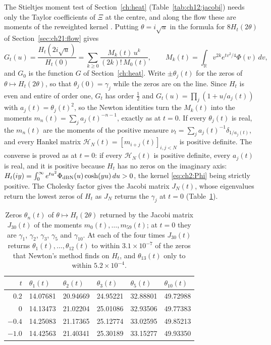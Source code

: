 The Stieltjes moment test of Section~\ref{ch:heat} (Table~\ref{tab:ch12:jacobi}) needs only the Taylor coefficients of $\Xi$ at the centre, and along the flow these are moments of the reweighted kernel \cite{P26wig}. Putting $\theta=i\sqrt u$ in the formula for $8H_t(2\theta)$ of Section~\ref{sec:ch21:flow} gives
\[
G_t(u)=\frac{H_t(2i\sqrt u)}{H_t(0)}=\sum_{k\ge0}\frac{M_k(t)\,u^k}{(2k)!\,M_0(t)},\qquad M_k(t)=\int_{\mathbb R}v^{2k}e^{tv^2/4}\Phi(v)\,dv,
\]
and $G_0$ is the function $G$ of Section~\ref{ch:heat}. Write $\pm\theta_j(t)$ for the zeros of $\theta\mapsto H_t(2\theta)$, so that $\theta_j(0)=\gamma_j$ while the zeros are on the line. Since $H_t$ is even and entire of order one, $G_t$ has order $\frac12$ and $G_t(u)=\prod_j(1+u/a_j(t))$ with $a_j(t)=\theta_j(t)^2$, so the Newton identities turn the $M_k(t)$ into the moments $m_n(t)=\sum_ja_j(t)^{-n-1}$, exactly as at $t=0$. If every $\theta_j(t)$ is real, the $m_n(t)$ are the moments of the positive measure $\nu_t=\sum_ja_j(t)^{-1}\delta_{1/a_j(t)}$, and every Hankel matrix $\mathcal H_N(t)=[m_{i+j}(t)]_{i,j<N}$ is positive definite. The converse is proved as at $t=0$: if every $\mathcal H_N(t)$ is positive definite, every $a_j(t)$ is real, and it is positive because $H_t$ has no zeros on the imaginary axis: $H_t(iy)=\int_0^\infty e^{tu^2}\Phi_{\rm dBN}(u)\cosh(yu)\,du>0$, the kernel \eqref{eq:ch2:Phi} being strictly positive. The Cholesky factor gives the Jacobi matrix $J_N(t)$, whose eigenvalues return the lowest zeros of $H_t$ as $J_N$ returns the $\gamma_j$ at $t=0$ (Table~\ref{tab:ch21:flowzeros}).

\begin{table}[htbp]
\centering\small
\begin{tabular}{rlllll}
\toprule
$t$ & $\theta_1(t)$ & $\theta_2(t)$ & $\theta_3(t)$ & $\theta_5(t)$ & $\theta_{10}(t)$\\
\midrule
$0.2$ & 14.07681 & 20.94669 & 24.95221 & 32.88801 & 49.72988\\
$0$ & 14.13473 & 21.02204 & 25.01086 & 32.93506 & 49.77383\\
$-0.4$ & 14.25083 & 21.17365 & 25.12774 & 33.02595 & 49.85213\\
$-1.0$ & 14.42563 & 21.40341 & 25.30189 & 33.15277 & 49.93350\\
\bottomrule
\end{tabular}
\caption{Zeros $\theta_n(t)$ of $\theta\mapsto H_t(2\theta)$ returned by the Jacobi matrix $J_{30}(t)$ of the moments $m_0(t),\dots,m_{59}(t)$; at $t=0$ they are $\gamma_1$, $\gamma_2$, $\gamma_3$, $\gamma_5$ and $\gamma_{10}$. At each of the four times $J_{30}(t)$ returns $\theta_1(t),\dots,\theta_{12}(t)$ to within $3.1\times10^{-7}$ of the zeros that Newton's method finds on $H_t$, and $\theta_{13}(t)$ only to within $5.2\times10^{-4}$.}
\label{tab:ch21:flowzeros}
\end{table}

